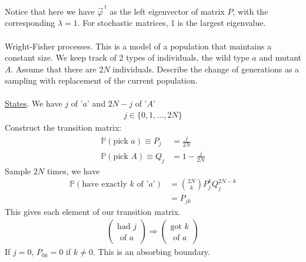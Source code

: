\documentclass[12pt, letterpaper]{article}
\begin{document}
Notice that here we have $\vec \varphi^{\ t}$ as the left eigenvector of matrix $P$, with the 
corresponding $\lambda = 1$. For stochastic matrices, 1 is the largest eigenvalue. \\ \\
 Wright-Fisher processes. This is a model of a population that maintains 
a constant size. We keep track of 2 types of individuals, the wild type $a$ and mutant $A$.
Assume that there are $2N$ individuals. Describe the change of generations as a sampling 
with replacement of the current population. \\ \\
\underline{States}. We have $j$ of '$a$' and $2N-j$ of '$A$' 
\begin{align*}
    j \in \{0,1,\dots, 2N\}
\end{align*}
Construct the transition matrix:
\begin{align*}
    \mathbb{P}(\text{pick } a) \equiv P_j &= \frac{j}{2N} \\
    \mathbb{P}(\text{pick } A) \equiv Q_j &= 1 - \frac{j}{2N} 
\end{align*}
Sample $2N$ times, we have 
\begin{align*}
    \mathbb{P}(\text{have exactly }k \text{ of '}a\text{'}) &= {2N\choose k} P_j^k Q_j^{2N - k} \\
    &= P_{jk}
\end{align*}
This gives each element of our transition matrix.
\begin{align*}
    \left(\begin{matrix}
        \text{had }j \\ \text{ of }a
    \end{matrix}\right) \Rightarrow
    \left(\begin{matrix}
        \text{got }k \\ \text{ of }a
    \end{matrix}\right)
\end{align*}
If $j = 0$, $P_{0k} = 0$ if $k \ne 0$. This is an absorbing boundary.
\end{document}
